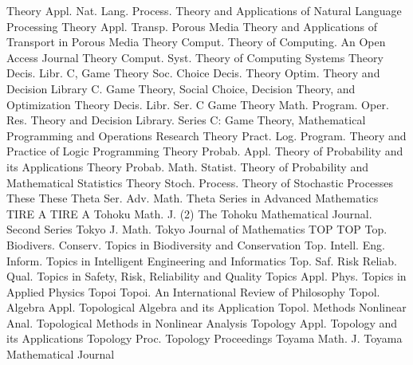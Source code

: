 {Theory Appl. Nat. Lang. Process.}
{Theory and Applications of Natural Language Processing}
{Theory Appl. Transp. Porous Media}
{Theory and Applications of Transport in Porous Media}
{Theory Comput.}
{Theory of Computing. An Open Access Journal}
{Theory Comput. Syst.}
{Theory of Computing Systems}
{Theory Decis. Libr. C, Game Theory Soc. Choice Decis. Theory Optim.}
{Theory and Decision Library C. Game Theory, Social Choice, Decision Theory, and Optimization}
{Theory Decis. Libr. Ser. C Game Theory Math. Program. Oper. Res.}
{Theory and Decision Library. Series C: Game Theory, Mathematical Programming and Operations Research}
{Theory Pract. Log. Program.}
{Theory and Practice of Logic Programming}
{Theory Probab. Appl.}
{Theory of Probability and its Applications}
{Theory Probab. Math. Statist.}
{Theory of Probability and Mathematical Statistics}
{Theory Stoch. Process.}
{Theory of Stochastic Processes}
{These}
{These}
{Theta Ser. Adv. Math.}
{Theta Series in Advanced Mathematics}
{TIRE A}
{TIRE A}
{Tohoku Math. J. (2)}
{The Tohoku Mathematical Journal. Second Series}
{Tokyo J. Math.}
{Tokyo Journal of Mathematics}
{TOP}
{TOP}
{Top. Biodivers. Conserv.}
{Topics in Biodiversity and Conservation}
{Top. Intell. Eng. Inform.}
{Topics in Intelligent Engineering and Informatics}
{Top. Saf. Risk Reliab. Qual.}
{Topics in Safety, Risk, Reliability and Quality}
{Topics Appl. Phys.}
{Topics in Applied Physics}
{Topoi}
{Topoi. An International Review of Philosophy}
{Topol. Algebra Appl.}
{Topological Algebra and its Application}
{Topol. Methods Nonlinear Anal.}
{Topological Methods in Nonlinear Analysis}
{Topology Appl.}
{Topology and its Applications}
{Topology Proc.}
{Topology Proceedings}
{Toyama Math. J.}
{Toyama Mathematical Journal}
